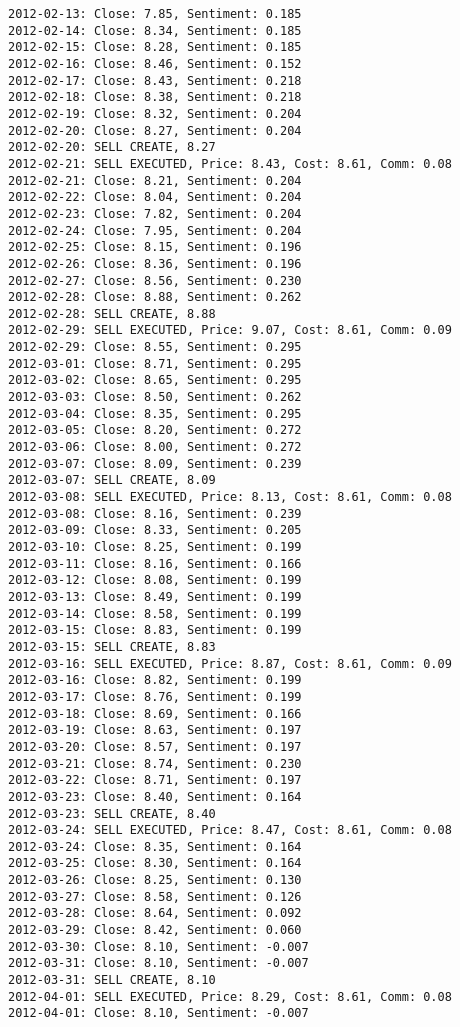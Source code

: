 \documentclass[11pt]{article}
\begin{document}
\begin{Verbatim}[commandchars=\\\{\}]
2012-02-13: Close: 7.85, Sentiment: 0.185
2012-02-14: Close: 8.34, Sentiment: 0.185
2012-02-15: Close: 8.28, Sentiment: 0.185
2012-02-16: Close: 8.46, Sentiment: 0.152
2012-02-17: Close: 8.43, Sentiment: 0.218
2012-02-18: Close: 8.38, Sentiment: 0.218
2012-02-19: Close: 8.32, Sentiment: 0.204
2012-02-20: Close: 8.27, Sentiment: 0.204
2012-02-20: SELL CREATE, 8.27
2012-02-21: SELL EXECUTED, Price: 8.43, Cost: 8.61, Comm: 0.08
2012-02-21: Close: 8.21, Sentiment: 0.204
2012-02-22: Close: 8.04, Sentiment: 0.204
2012-02-23: Close: 7.82, Sentiment: 0.204
2012-02-24: Close: 7.95, Sentiment: 0.204
2012-02-25: Close: 8.15, Sentiment: 0.196
2012-02-26: Close: 8.36, Sentiment: 0.196
2012-02-27: Close: 8.56, Sentiment: 0.230
2012-02-28: Close: 8.88, Sentiment: 0.262
2012-02-28: SELL CREATE, 8.88
2012-02-29: SELL EXECUTED, Price: 9.07, Cost: 8.61, Comm: 0.09
2012-02-29: Close: 8.55, Sentiment: 0.295
2012-03-01: Close: 8.71, Sentiment: 0.295
2012-03-02: Close: 8.65, Sentiment: 0.295
2012-03-03: Close: 8.50, Sentiment: 0.262
2012-03-04: Close: 8.35, Sentiment: 0.295
2012-03-05: Close: 8.20, Sentiment: 0.272
2012-03-06: Close: 8.00, Sentiment: 0.272
2012-03-07: Close: 8.09, Sentiment: 0.239
2012-03-07: SELL CREATE, 8.09
2012-03-08: SELL EXECUTED, Price: 8.13, Cost: 8.61, Comm: 0.08
2012-03-08: Close: 8.16, Sentiment: 0.239
2012-03-09: Close: 8.33, Sentiment: 0.205
2012-03-10: Close: 8.25, Sentiment: 0.199
2012-03-11: Close: 8.16, Sentiment: 0.166
2012-03-12: Close: 8.08, Sentiment: 0.199
2012-03-13: Close: 8.49, Sentiment: 0.199
2012-03-14: Close: 8.58, Sentiment: 0.199
2012-03-15: Close: 8.83, Sentiment: 0.199
2012-03-15: SELL CREATE, 8.83
2012-03-16: SELL EXECUTED, Price: 8.87, Cost: 8.61, Comm: 0.09
2012-03-16: Close: 8.82, Sentiment: 0.199
2012-03-17: Close: 8.76, Sentiment: 0.199
2012-03-18: Close: 8.69, Sentiment: 0.166
2012-03-19: Close: 8.63, Sentiment: 0.197
2012-03-20: Close: 8.57, Sentiment: 0.197
2012-03-21: Close: 8.74, Sentiment: 0.230
2012-03-22: Close: 8.71, Sentiment: 0.197
2012-03-23: Close: 8.40, Sentiment: 0.164
2012-03-23: SELL CREATE, 8.40
2012-03-24: SELL EXECUTED, Price: 8.47, Cost: 8.61, Comm: 0.08
2012-03-24: Close: 8.35, Sentiment: 0.164
2012-03-25: Close: 8.30, Sentiment: 0.164
2012-03-26: Close: 8.25, Sentiment: 0.130
2012-03-27: Close: 8.58, Sentiment: 0.126
2012-03-28: Close: 8.64, Sentiment: 0.092
2012-03-29: Close: 8.42, Sentiment: 0.060
2012-03-30: Close: 8.10, Sentiment: -0.007
2012-03-31: Close: 8.10, Sentiment: -0.007
2012-03-31: SELL CREATE, 8.10
2012-04-01: SELL EXECUTED, Price: 8.29, Cost: 8.61, Comm: 0.08
2012-04-01: Close: 8.10, Sentiment: -0.007

\end{Verbatim}
\end{document}

